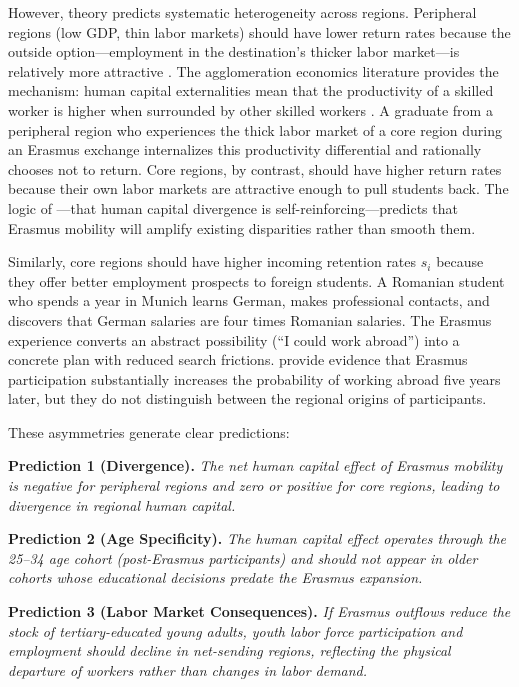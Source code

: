 \documentclass[12pt]{article}
\begin{document}
However, theory predicts systematic heterogeneity across regions. Peripheral regions (low GDP, thin labor markets) should have lower return rates because the outside option---employment in the destination's thicker labor market---is relatively more attractive \citep{moretti_2011}. The agglomeration economics literature provides the mechanism: human capital externalities mean that the productivity of a skilled worker is higher when surrounded by other skilled workers \citep{moretti_2004, glaeser_saiz_2004}. A graduate from a peripheral region who experiences the thick labor market of a core region during an Erasmus exchange internalizes this productivity differential and rationally chooses not to return. Core regions, by contrast, should have higher return rates because their own labor markets are attractive enough to pull students back. The logic of \citet{berry_glaeser_2005}---that human capital divergence is self-reinforcing---predicts that Erasmus mobility will amplify existing disparities rather than smooth them.

Similarly, core regions should have higher incoming retention rates $s_i$ because they offer better employment prospects to foreign students. A Romanian student who spends a year in Munich learns German, makes professional contacts, and discovers that German salaries are four times Romanian salaries. The Erasmus experience converts an abstract possibility (``I could work abroad'') into a concrete plan with reduced search frictions. \citet{parey_waldinger_2011} provide evidence that Erasmus participation substantially increases the probability of working abroad five years later, but they do not distinguish between the regional origins of participants.

These asymmetries generate clear predictions:

\medskip
\noindent\textbf{Prediction 1 (Divergence).} \textit{The net human capital effect of Erasmus mobility is negative for peripheral regions and zero or positive for core regions, leading to divergence in regional human capital.}

\medskip
\noindent\textbf{Prediction 2 (Age Specificity).} \textit{The human capital effect operates through the 25--34 age cohort (post-Erasmus participants) and should not appear in older cohorts whose educational decisions predate the Erasmus expansion.}

\medskip
\noindent\textbf{Prediction 3 (Labor Market Consequences).} \textit{If Erasmus outflows reduce the stock of tertiary-educated young adults, youth labor force participation and employment should decline in net-sending regions, reflecting the physical departure of workers rather than changes in labor demand.}
\end{document}
